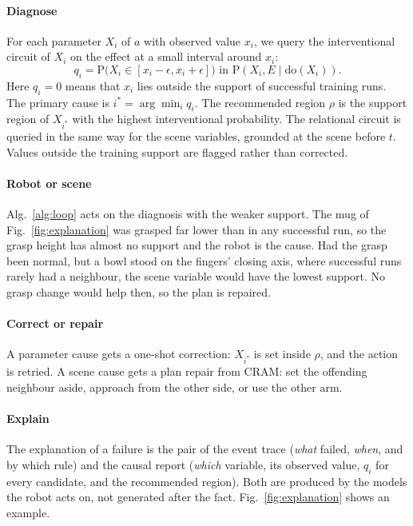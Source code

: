 \documentclass[letterpaper, 10 pt, conference]{ieeeconf}
\newcommand{\pr}{\mathrm{P}}
\newcommand{\dop}{\mathrm{do}}
\begin{document}
\paragraph*{Diagnose}
For each parameter $X_i$ of $a$ with observed value $x_i$, we query the
interventional circuit of $X_i$ on the effect at a small interval around $x_i$:
\begin{equation}
  q_i = \pr\big(X_i \in [x_i - \epsilon, x_i + \epsilon]\big)
  \text{ in } \pr(X_i, E \mid \dop(X_i)).
  \label{eq:diagnosis}
\end{equation}
Here $q_i = 0$ means that $x_i$ lies outside the support of successful
training runs. The primary cause is $i^\ast = \arg\min_i q_i$. The recommended
region $\rho$ is the support region of $X_{i^\ast}$ with the highest
interventional probability. The relational circuit is queried in the same way
for the scene variables, grounded at the scene before $t$. Values outside the
training support are flagged rather than corrected.

\paragraph*{Robot or scene}
Alg.~\ref{alg:loop} acts on the diagnosis with the weaker support. The mug of
Fig.~\ref{fig:explanation} was grasped far lower than in any successful run, so
the grasp height has almost no support and the robot is the cause. Had the
grasp been normal, but a bowl stood on the fingers' closing axis, where
successful runs rarely had a neighbour, the scene variable would have the
lowest support. No grasp change would help then, so the plan is repaired.

\paragraph*{Correct or repair}
A parameter cause gets a one-shot correction: $X_{i^\ast}$ is set inside
$\rho$, and the action is retried. A scene cause gets a plan repair from CRAM:
set the offending neighbour aside, approach from the other side, or use the
other arm.

\paragraph*{Explain}
The explanation of a failure is the pair of the event trace (\emph{what} failed,
\emph{when}, and by which rule) and the causal report (\emph{which} variable,
its observed value, $q_i$ for every candidate, and the recommended region).
Both are produced by the models the robot acts on, not generated after the
fact. Fig.~\ref{fig:explanation} shows an example.
\end{document}
